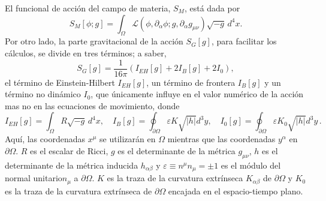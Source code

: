 El funcional de acción del campo de materia, $S_{M}$, está dada por
%
\begin{equation}
\label{eq:SM}
S_{M} [\phi; g] = \int_{\Omega} \mathcal{L}(\phi, \partial_{\alpha} \phi; g, \partial_{\alpha} g_{\mu \nu}) \sqrt{-g} \, d^{4} x.
\end{equation}
%
Por otro lado, la parte gravitacional de la acción $S_{G}[g]$, para facilitar los cálculos, se divide en tres términos; a saber,
%
\begin{equation}
\label{eq:SG}
S_{G}[g] = \frac{1}{16 \pi} (I_{EH}[g] + 2 I_{B}[g] + 2 I_{0}),
\end{equation}
%
el término de Einstein-Hilbert $I_{EH}[g]$, un término de frontera $I_{B}[g]$ y un término no dinámico $I_{0}$, que únicamente influye en el valor numérico de la acción mas no en las ecuaciones de movimiento, donde
%
\begin{equation*}
I_{EH}[g] = \int_{\Omega} R \sqrt{-g} \, d^{4} x, \quad I_{B}[g] = \oint_{\partial \Omega} \varepsilon K \sqrt{|h|} d^{3} y, \quad I_{0}[g] = \oint_{\partial \Omega} \varepsilon K_{0} \sqrt{|h|} d^{3} y \, .
\end{equation*}
%
Aquí, las coordenadas $x^{\mu}$ se utilizarán en $\Omega$ mientras que las coordenadas $y^{\alpha}$ en $\partial \Omega$. $R$ es el escalar de Ricci, $g$ es el determinante de la métrica $g_{\mu \nu}$, $h$ es el determinante de la métrica inducida $h_{\alpha \beta}$ y $\varepsilon \equiv n^{\mu} n_{\mu} = \pm 1$ es el módulo del normal unitario\footnotemark  $n_{\mu}$ a $\partial \Omega$. $K$ es la traza de la curvatura extrínseca $K_{\alpha \beta}$ de $\partial \Omega$ y $K_{0}$ es la traza de la curvatura extrínseca de $\partial \Omega$ encajada en el espacio-tiempo plano.

